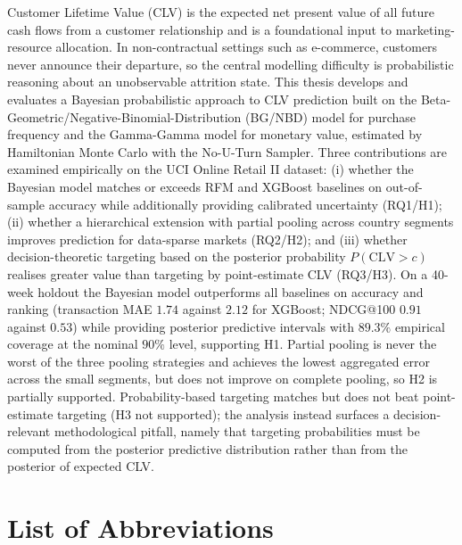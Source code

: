 \documentclass[12pt, a4paper, oneside]{report}
\begin{document}
Customer Lifetime Value (CLV) is the expected net present value of all future cash flows from a customer relationship and is a foundational input to marketing-resource allocation. In non-contractual settings such as e-commerce, customers never announce their departure, so the central modelling difficulty is probabilistic reasoning about an unobservable attrition state. This thesis develops and evaluates a Bayesian probabilistic approach to CLV prediction built on the Beta-Geometric/Negative-Binomial-Distribution (BG/NBD) model for purchase frequency and the Gamma-Gamma model for monetary value, estimated by Hamiltonian Monte Carlo with the No-U-Turn Sampler. Three contributions are examined empirically on the UCI Online Retail II dataset: (i) whether the Bayesian model matches or exceeds RFM and XGBoost baselines on out-of-sample accuracy while additionally providing calibrated uncertainty (RQ1/H1); (ii) whether a hierarchical extension with partial pooling across country segments improves prediction for data-sparse markets (RQ2/H2); and (iii) whether decision-theoretic targeting based on the posterior probability $P(\text{CLV} > c)$ realises greater value than targeting by point-estimate CLV (RQ3/H3). On a 40-week holdout the Bayesian model outperforms all baselines on accuracy and ranking (transaction MAE $1.74$ against $2.12$ for XGBoost; NDCG@100 $0.91$ against $0.53$) while providing posterior predictive intervals with $89.3\%$ empirical coverage at the nominal $90\%$ level, supporting H1. Partial pooling is never the worst of the three pooling strategies and achieves the lowest aggregated error across the small segments, but does not improve on complete pooling, so H2 is partially supported. Probability-based targeting matches but does not beat point-estimate targeting (H3 not supported); the analysis instead surfaces a decision-relevant methodological pitfall, namely that targeting probabilities must be computed from the posterior predictive distribution rather than from the posterior of expected CLV.

\clearpage
{}
\tableofcontents
\listoffigures
\listoftables

\clearpage
\chapter*{List of Abbreviations}
\end{document}
